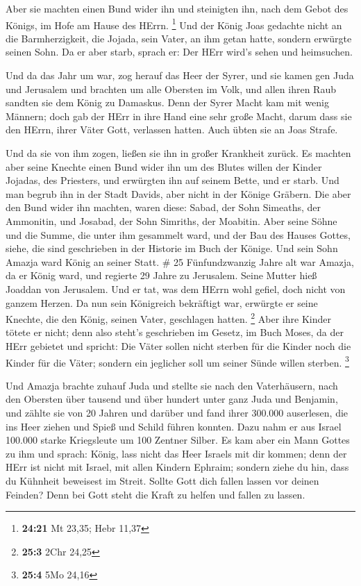  Aber sie machten einen Bund wider ihn und steinigten ihn,
nach dem Gebot des Königs, im Hofe am Hause des HErrn. \footnote{\textbf{24:21}
  Mt 23,35; Hebr 11,37}  Und der König Joas gedachte nicht
an die Barmherzigkeit, die Jojada, sein Vater, an ihm getan hatte,
sondern erwürgte seinen Sohn. Da er aber starb, sprach er: Der HErr
wird's sehen und heimsuchen.

 Und da das Jahr um war, zog herauf das Heer der Syrer, und
sie kamen gen Juda und Jerusalem und brachten um alle Obersten im Volk,
und allen ihren Raub sandten sie dem König zu Damaskus. 
Denn der Syrer Macht kam mit wenig Männern; doch gab der HErr in ihre
Hand eine sehr große Macht, darum dass sie den HErrn, ihrer Väter Gott,
verlassen hatten. Auch übten sie an Joas Strafe.

 Und da sie von ihm zogen, ließen sie ihn in großer
Krankheit zurück. Es machten aber seine Knechte einen Bund wider ihn um
des Blutes willen der Kinder Jojadas, des Priesters, und erwürgten ihn
auf seinem Bette, und er starb. Und man begrub ihn in der Stadt Davids,
aber nicht in der Könige Gräbern.  Die aber den Bund wider
ihn machten, waren diese: Sabad, der Sohn Simeaths, der Ammonitin, und
Josabad, der Sohn Simriths, der Moabitin.  Aber seine Söhne
und die Summe, die unter ihm gesammelt ward, und der Bau des Hauses
Gottes, siehe, die sind geschrieben in der Historie im Buch der Könige.
Und sein Sohn Amazja ward König an seiner Statt. \# 25 
Fünfundzwanzig Jahre alt war Amazja, da er König ward, und regierte 29
Jahre zu Jerusalem. Seine Mutter hieß Joaddan von Jerusalem.
 Und er tat, was dem HErrn wohl gefiel, doch nicht von
ganzem Herzen.  Da nun sein Königreich bekräftigt war,
erwürgte er seine Knechte, die den König, seinen Vater, geschlagen
hatten. \footnote{\textbf{25:3} 2Chr 24,25}  Aber ihre
Kinder tötete er nicht; denn also steht's geschrieben im Gesetz, im Buch
Moses, da der HErr gebietet und spricht: Die Väter sollen nicht sterben
für die Kinder noch die Kinder für die Väter; sondern ein jeglicher soll
um seiner Sünde willen sterben. \footnote{\textbf{25:4} 5Mo 24,16}

 Und Amazja brachte zuhauf Juda und stellte sie nach den
Vaterhäusern, nach den Obersten über tausend und über hundert unter ganz
Juda und Benjamin, und zählte sie von 20 Jahren und darüber und fand
ihrer 300.000 auserlesen, die ins Heer ziehen und Spieß und Schild
führen konnten.  Dazu nahm er aus Israel 100.000 starke
Kriegsleute um 100 Zentner Silber.  Es kam aber ein Mann
Gottes zu ihm und sprach: König, lass nicht das Heer Israels mit dir
kommen; denn der HErr ist nicht mit Israel, mit allen Kindern Ephraim;
 sondern ziehe du hin, dass du Kühnheit beweisest im Streit.
Sollte Gott dich fallen lassen vor deinen Feinden? Denn bei Gott steht
die Kraft zu helfen und fallen zu lassen.

